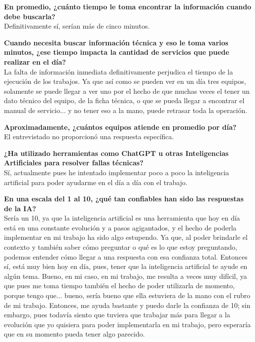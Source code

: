 {{    \textbf{En promedio, ¿cuánto tiempo le toma encontrar la información cuando debe buscarla?}\\
    Definitivamente sí, serían más de cinco minutos.

    \textbf{Cuando necesita buscar información técnica y eso le toma varios minutos, ¿ese tiempo impacta la cantidad de servicios que puede realizar en el día?}\\
    La falta de información inmediata definitivamente perjudica el tiempo de la ejecución de los trabajos. Ya que así como se pueden ver en un día tres equipos, solamente se puede llegar a ver uno por el hecho de que muchas veces el tener un dato técnico del equipo, de la ficha técnica, o que se pueda llegar a encontrar el manual de servicio... y no tener eso a la mano, puede retrasar toda la operación.

    \textbf{Aproximadamente, ¿cuántos equipos atiende en promedio por día?}\\
    El entrevistado no proporcionó una respuesta específica.

    \textbf{¿Ha utilizado herramientas como ChatGPT u otras Inteligencias Artificiales para resolver fallas técnicas?}\\
    Sí, actualmente pues he intentado implementar poco a poco la inteligencia artificial para poder ayudarme en el día a día con el trabajo.

    \textbf{En una escala del 1 al 10, ¿qué tan confiables han sido las respuestas de la IA?}\\
    Sería un 10, ya que la inteligencia artificial es una herramienta que hoy en día está en una constante evolución y a pasos agigantados, y el hecho de poderla implementar en mi trabajo ha sido algo estupendo. Ya que, al poder brindarle el contexto y también saber cómo preguntar o qué es lo que estoy preguntando, podemos entender cómo llegar a una respuesta con esa confianza total. Entonces sí, está muy bien hoy en día, pues, tener que la inteligencia artificial te ayude en algún tema. Bueno, en mi caso, en mi trabajo, me resulta a veces muy difícil, ya que pues me toma tiempo también el hecho de poder utilizarla de momento, porque tengo que... bueno, sería bueno que ella estuviera de la mano con el rubro de mi trabajo. Entonces, me ayuda bastante y puedo darle la confianza de 10; sin embargo, pues todavía siento que tuviera que trabajar más para llegar a la evolución que yo quisiera para poder implementarla en mi trabajo, pero esperaría que en su momento pueda tener algo parecido.

}}
